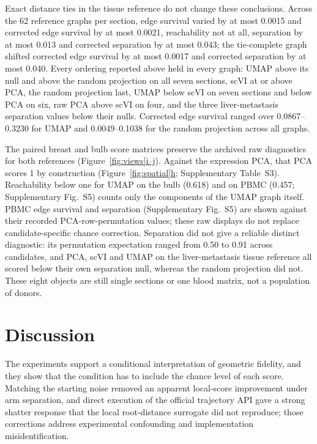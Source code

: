 \documentclass[11pt]{article}
\newcommand{\figpanel}[2]{Figure~\hyperref[#1]{\ref*{#1}#2}}
\begin{document}
Exact distance ties in the tissue reference do not change these conclusions. Across the 62 reference graphs per section, edge survival varied by at most 0.0015 and corrected edge survival by at most 0.0021, reachability not at all, separation by at most 0.013 and corrected separation by at most 0.043; the tie-complete graph shifted corrected edge survival by at most 0.0017 and corrected separation by at most 0.040. Every ordering reported above held in every graph: UMAP above its null and above the random projection on all seven sections, scVI at or above PCA, the random projection last, UMAP below scVI on seven sections and below PCA on six, raw PCA above scVI on four, and the three liver-metastasis separation values below their nulls. Corrected edge survival ranged over 0.0867--0.3230 for UMAP and 0.0049--0.1038 for the random projection across all graphs.








\FloatBarrier

The paired breast and bulb score matrices preserve the archived raw diagnostics for both references (\figpanel{fig:views}{i--j}). Against the expression PCA, that PCA scores 1 by construction (\figpanel{fig:spatial}{h}; Supplementary Table~S3). Reachability below one for UMAP on the bulb (0.618) and on PBMC (0.457; Supplementary Fig.~S5) counts only the components of the UMAP graph itself. PBMC edge survival and separation (Supplementary Fig.~S5) are shown against their recorded PCA-row-permutation values; these raw displays do not replace candidate-specific chance correction. Separation did not give a reliable distinct diagnostic: its permutation expectation ranged from 0.50 to 0.91 across candidates, and PCA, scVI and UMAP on the liver-metastasis tissue reference all scored below their own separation null, whereas the random projection did not. These eight objects are still single sections or one blood matrix, not a population of donors.



\FloatBarrier

\section{Discussion}
The experiments support a conditional interpretation of geometric fidelity, and they show that the condition has to include the chance level of each score. Matching the starting noise removed an apparent local-score improvement under arm separation, and direct execution of the official trajectory API gave a strong shatter response that the local root-distance surrogate did not reproduce; those corrections address experimental confounding and implementation misidentification.
\end{document}
